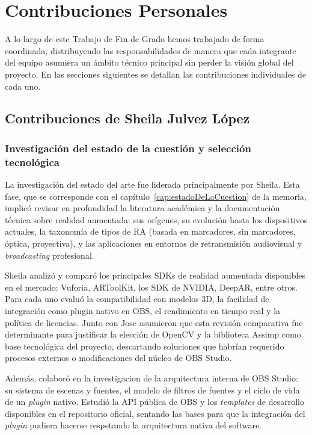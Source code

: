 \chapter*{Contribuciones Personales}
\label{cap:contribucionesPersonales}

A lo largo de este Trabajo de Fin de Grado hemos trabajado de forma coordinada, distribuyendo las responsabilidades de manera que cada integrante del equipo asumiera un ámbito técnico principal sin perder la visión global del proyecto. En las secciones siguientes se detallan las contribuciones individuales de cada uno.

\section*{Contribuciones de Sheila Julvez López}

\subsection*{Investigación del estado de la cuestión y selección tecnológica}

La investigación del estado del arte fue liderada principalmente por Sheila. Esta fase, que se corresponde con el capítulo~\ref{cap:estadoDeLaCuestion} de la memoria, implicó revisar en profundidad la literatura académica y la documentación técnica sobre realidad aumentada: sus orígenes, su evolución hasta los dispositivos actuales, la taxonomía de tipos de RA (basada en marcadores, sin marcadores, óptica, proyectiva), y las aplicaciones en entornos de retransmisión audiovisual y \textit{broadcasting} profesional.

Sheila analizó y comparó los principales SDKs de realidad aumentada disponibles en el mercado: Vuforia, ARToolKit, los SDK de NVIDIA, DeepAR, entre otros. Para cada uno evaluó la compatibilidad con modelos 3D, la facilidad de integración como plugin nativo en OBS, el rendimiento en tiempo real y la política de licencias. Junto con Jose asumieron que esta revisión comparativa fue determinante para justificar la elección de OpenCV y la biblioteca Assimp como base tecnológica del proyecto, descartando soluciones que habrían requerido procesos externos o modificaciones del núcleo de OBS Studio.

Además, colaboró en la investigacion de la arquitectura interna de OBS Studio: su sistema de escenas y fuentes, el modelo de filtros de fuentes y el ciclo de vida de un \textit{plugin} nativo. Estudió la API pública de OBS y los \textit{templates} de desarrollo disponibles en el repositorio oficial, sentando las bases para que la integración del \textit{plugin} pudiera hacerse respetando la arquitectura nativa del software.

